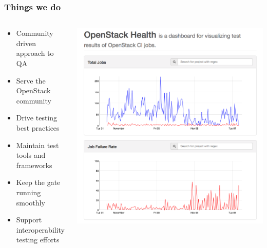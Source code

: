 \documentclass[aspectratio=169,11pt,hyperref={colorlinks=true}]{beamer}
\begin{document}
\begin{frame}
    \frametitle{Things we do}
    \begin{columns}
    \begin{column}{0.5\textwidth}
    \begin{itemize}
        \item{Community driven approach to QA}
        \item{Serve the OpenStack community}
        \item{Drive testing best practices}
        \item{Maintain test tools and frameworks}
        \item{Keep the gate running smoothly}
        \item{Support interoperability testing efforts}
    \end{itemize}
    \end{column}
    \begin{column}{0.5\textwidth}
        \includegraphics[width=1.0\textwidth]{openstack-health.png}
    \end{column}
    \end{columns}
\end{frame}
\end{document}

